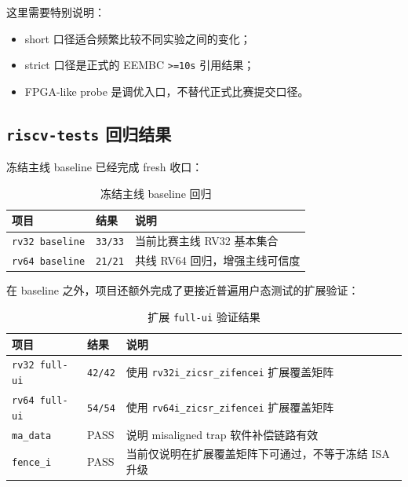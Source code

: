 这里需要特别说明：

\begin{itemize}
    \item short 口径适合频繁比较不同实验之间的变化；
    \item strict 口径是正式的 EEMBC \texttt{>=10s} 引用结果；
    \item FPGA-like probe 是调优入口，不替代正式比赛提交口径。
\end{itemize}

\subsection{\texttt{riscv-tests} 回归结果}

冻结主线 baseline 已经完成 fresh 收口：

\begin{table}[H]
    \centering
    \caption{冻结主线 baseline 回归}
    \begin{tabular}{p{} p{} p{}}
        \toprule
        项目 & 结果 & 说明 \\
        \midrule
        \texttt{rv32 baseline} & \texttt{33/33} & 当前比赛主线 RV32 基本集合 \\
        \texttt{rv64 baseline} & \texttt{21/21} & 共线 RV64 回归，增强主线可信度 \\
        \bottomrule
    \end{tabular}
\end{table}

在 baseline 之外，项目还额外完成了更接近普遍用户态测试的扩展验证：

\begin{table}[H]
    \centering
    \caption{扩展 \texttt{full-ui} 验证结果}
    \begin{tabular}{p{} p{} p{}}
        \toprule
        项目 & 结果 & 说明 \\
        \midrule
        \texttt{rv32 full-ui} & \texttt{42/42} & 使用 \texttt{rv32i\_zicsr\_zifencei} 扩展覆盖矩阵 \\
        \texttt{rv64 full-ui} & \texttt{54/54} & 使用 \texttt{rv64i\_zicsr\_zifencei} 扩展覆盖矩阵 \\
        \texttt{ma\_data} & PASS & 说明 misaligned trap 软件补偿链路有效 \\
        \texttt{fence\_i} & PASS & 当前仅说明在扩展覆盖矩阵下可通过，不等于冻结 ISA 升级 \\
        \bottomrule
    \end{tabular}
\end{table}

